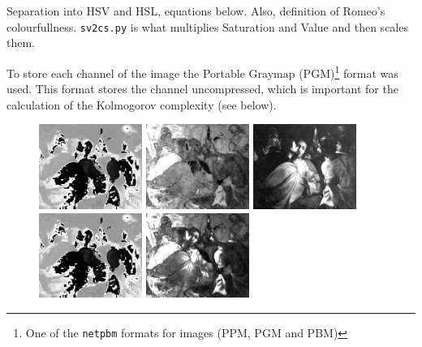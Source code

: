 \documentclass[11pt,a4paper,draft]{report}
\begin{document}
\begin{multicols}{2}
Separation into HSV and HSL, equations below.  Also, definition of Romeo's
colourfullness.  \texttt{sv2cs.py} is what multiplies Saturation and Value and
then scales them.

To store each channel of the image the Portable Graymap (PGM)\footnote{One of
the \texttt{netpbm} formats for images (PPM, PGM and PBM)} format was used.
This format stores the channel uncompressed, which is important for the
calculation of the Kolmogorov complexity (see below).

\begin{figure}[tbp]
\centering
\includegraphics[width=0.30\textwidth]{H_caravaggio_1962_139_1}
\includegraphics[width=0.30\textwidth]{SHSV_caravaggio_1962_139_1}
\includegraphics[width=0.30\textwidth]{V_caravaggio_1962_139_1}
\includegraphics[width=0.30\textwidth]{H_caravaggio_1962_139_1}
\includegraphics[width=0.30\textwidth]{SHSL_caravaggio_1962_139_1}

\end{figure}
\end{multicols}
\end{document}
